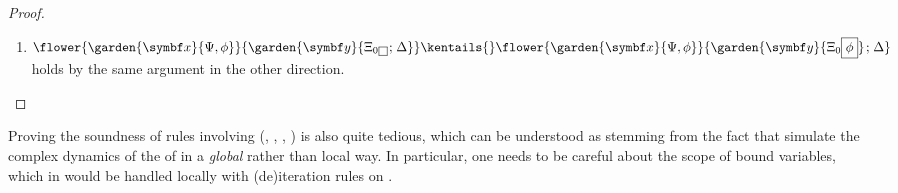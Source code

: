 \begin{scope}
\begin{proof}
\begin{description}
\begin{enumerate}
\begin{itemize}
        Since $\fv(\phi) \cap \by = \emptyset$ we have
        $\eforces{w'}{\phi}{\update{e}{\bx}{\update{e'}{\by}{e''}}}$,
        and thus $\eforces{w'}{\phi,
        \cfill{\Xi_0}{\phi}}{\update{e}{\bx}{\update{e'}{\by}{e''}}}$.
        Then by  we have $\eforces{w'}{\phi,
        \cfill{\Xi_0}{}}{\update{e}{\bx}{\update{e'}{\by}{e''}}}$,
        and thus we can conclude in particular that
        $\eforces{w'}{\cfill{\Xi_0}{}}{\update{e}{\bx}{\update{e'}{\by}{e''}}}$.
      \end{itemize}
    \item $\flower{\garden{\bx}{\Psi,
    \phi}}{\garden{\by}{\cfill{\Xi_0}{} \sep \Delta}}
    \kentails{} \flower{\garden{\bx}{\Psi,
    \phi}}{\garden{\by}{\cfill{\Xi_0}{\phi}} \sep \Delta}$ holds by the same
    argument in the other direction.
    \end{enumerate}
  \end{description}
\end{proof}

Proving the soundness of rules involving  (, ,
, ) is also quite tedious, which can be understood as stemming
from the fact that  simulate the complex dynamics of the
 of  in a \emph{global} rather than local way. In particular,
one needs to be careful about the scope of bound variables, which in 
would be handled locally with (de)iteration rules on .

\begin{lemma}
  

\end{lemma}
\end{scope}
